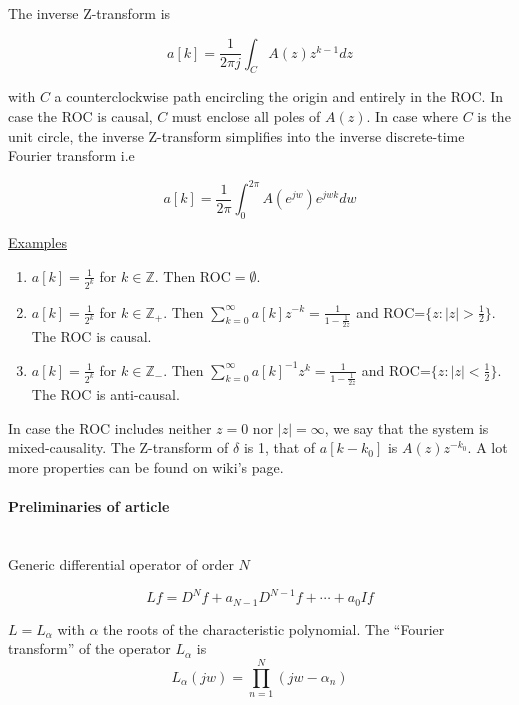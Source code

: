 \documentclass[a4paper, 11pt]{article}
\begin{document}
The inverse Z-transform is 

\begin{equation*}
  a[k] = \frac{1}{2\pi j} \int_{C} A(z)z^{k-1}dz
\end{equation*}

with $C$ a counterclockwise path encircling the origin and entirely in the ROC\@. In case the ROC is causal, $C$ must 
enclose all poles of $A(z)$. In case where $C$ is the unit circle, the inverse Z-transform simplifies into the inverse 
discrete-time Fourier transform i.e

\begin{equation*}
  a[k] = \frac{1}{2\pi}\int_{0}^{2\pi} A(e^{jw})e^{jwk} dw
\end{equation*}

\underline{Examples}
\begin{enumerate}
  \item $a[k] = \frac{1}{2^k}$ for $k \in \mathbb{Z}$. Then ROC$=\emptyset$.
  \item $a[k] = \frac{1}{2^k}$ for $k \in \mathbb{Z}_{+}$. Then $\displaystyle \sum_{k=0}^{\infty} a[k]z^{-k} = 
    \frac{1}{1-\frac{1}{2z}}$
    and ROC=$\{z: |z| > \frac{1}{2}\}$. The ROC is causal.
  \item $a[k] = \frac{1}{2^k}$ for $k \in \mathbb{Z}_{-}$. Then $\displaystyle \sum_{k=0}^{\infty} {a[k]}^{-1}z^{k} = 
    \frac{1}{1-\frac{1}{2z}}$
    and ROC=$\{z: |z| < \frac{1}{2}\}$. The ROC is anti-causal.
\end{enumerate}

In case the ROC includes neither $z=0$ nor $|z| = \infty$, we say that the system is mixed-causality. The Z-transform of 
$\delta$ is 1, that of $a[k-k_0]$ is $A(z)z^{-k_0}$. A lot more properties can be found on wiki's page. 

\paragraph{Preliminaries of article} \mbox{} \\

Generic differential operator of order $N$ 

\begin{equation*}
  L{f} = D^N{f} + a_{N-1}D^{N-1}{f} + \cdots + a_0 I{f}
\end{equation*}

$L = L_{\alpha}$ with $\alpha$ the roots of the characteristic polynomial. The “Fourier transform” of the operator 
$L_{\alpha}$ is
\begin{equation*}
  L_{\alpha}(jw) = \prod_{n=1}^N (jw-\alpha_n)
\end{equation*}
\end{document}
